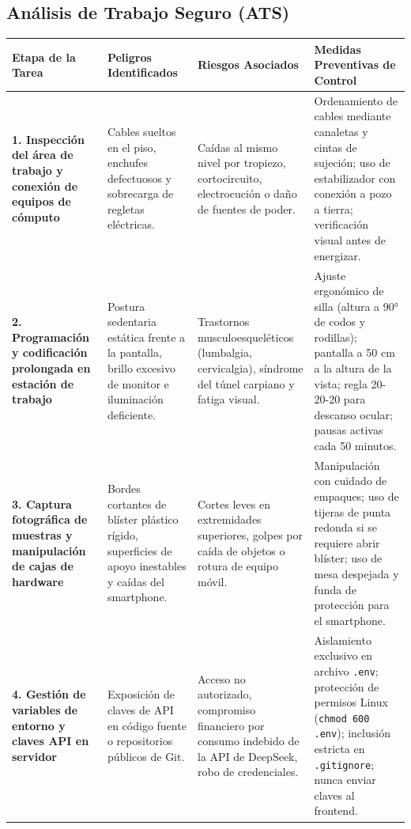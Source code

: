 \documentclass[11pt,a4paper]{article}
\begin{document}
\subsection{Análisis de Trabajo Seguro (ATS)}

\begin{table}[htbp]
\centering
\small
\begin{tabularx}{\textwidth}{p{3.2cm} p{3.8cm} p{3.5cm} X}
\toprule
\rowcolor{tableheader}
\color{white}\textbf{Etapa de la Tarea} & \color{white}\textbf{Peligros Identificados} & \color{white}\textbf{Riesgos Asociados} & \color{white}\textbf{Medidas Preventivas de Control} \\
\midrule
\rowcolor{lightrow}
\textbf{1. Inspección del área de trabajo y conexión de equipos de cómputo} & Cables sueltos en el piso, enchufes defectuosos y sobrecarga de regletas eléctricas. & Caídas al mismo nivel por tropiezo, cortocircuito, electrocución o daño de fuentes de poder. & Ordenamiento de cables mediante canaletas y cintas de sujeción; uso de estabilizador con conexión a pozo a tierra; verificación visual antes de energizar. \\
\midrule
\textbf{2. Programación y codificación prolongada en estación de trabajo} & Postura sedentaria estática frente a la pantalla, brillo excesivo de monitor e iluminación deficiente. & Trastornos musculoesqueléticos (lumbalgia, cervicalgia), síndrome del túnel carpiano y fatiga visual. & Ajuste ergonómico de silla (altura a 90° de codos y rodillas); pantalla a 50 cm a la altura de la vista; regla 20-20-20 para descanso ocular; pausas activas cada 50 minutos. \\
\midrule
\rowcolor{lightrow}
\textbf{3. Captura fotográfica de muestras y manipulación de cajas de hardware} & Bordes cortantes de blíster plástico rígido, superficies de apoyo inestables y caídas del smartphone. & Cortes leves en extremidades superiores, golpes por caída de objetos o rotura de equipo móvil. & Manipulación con cuidado de empaques; uso de tijeras de punta redonda si se requiere abrir blíster; uso de mesa despejada y funda de protección para el smartphone. \\
\midrule
\textbf{4. Gestión de variables de entorno y claves API en servidor} & Exposición de claves de API en código fuente o repositorios públicos de Git. & Acceso no autorizado, compromiso financiero por consumo indebido de la API de DeepSeek, robo de credenciales. & Aislamiento exclusivo en archivo \texttt{.env}; protección de permisos Linux (\texttt{chmod 600 .env}); inclusión estricta en \texttt{.gitignore}; nunca enviar claves al frontend. \\

\end{tabularx}
\end{table}
\end{document}
